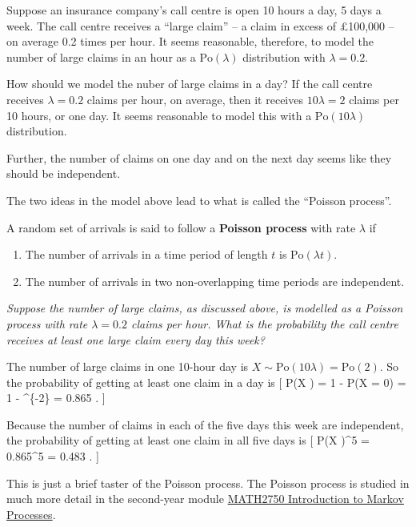 \documentclass[
  letterpaper,
]{report}
\providecommand{\tightlist}{%
  \setlength{\itemsep}{0pt}\setlength{\parskip}{0pt}}\usepackage{longtable,booktabs,array}
\theoremstyle{definition}
\theoremstyle{definition}
\theoremstyle{remark}
\begin{document}
Suppose an insurance company's call centre is open 10 hours a day, 5
days a week. The call centre receives a ``large claim'' -- a claim in
excess of £100,000 -- on average 0.2 times per hour. It seems
reasonable, therefore, to model the number of large claims in an hour as
a \(\mathrm{Po}(\lambda)\) distribution with \(\lambda = 0.2\).

How should we model the nuber of large claims in a day? If the call
centre receives \(\lambda = 0.2\) claims per hour, on average, then it
receives \(10\lambda = 2\) claims per 10 hours, or one day. It seems
reasonable to model this with a \(\mathrm{Po}(10\lambda)\) distribution.

Further, the number of claims on one day and on the next day seems like
they should be independent.

The two ideas in the model above lead to what is called the ``Poisson
process''.

A random set of arrivals is said to follow a \textbf{Poisson process}
with rate \(\lambda\) if

\begin{enumerate}
\def\labelenumi{\arabic{enumi}.}
\tightlist
\item
  The number of arrivals in a time period of length \(t\) is
  \(\mathrm{Po}(\lambda t)\).
\item
  The number of arrivals in two non-overlapping time periods are
  independent.
\end{enumerate}

\emph{Suppose the number of large claims, as discussed above, is
modelled as a Poisson process with rate \(\lambda = 0.2\) claims per
hour. What is the probability the call centre receives at least one
large claim every day this week?}

The number of large claims in one 10-hour day is
\(X \sim \mathrm{Po}(10\lambda) = \mathrm{Po}(2)\). So the probability
of getting at least one claim in a day is {[} \mathbb P(X ) = 1 -
\mathbb P(X = 0) = 1 - \^{}\{-2\} = 0.865 . {]}

Because the number of claims in each of the five days this week are
independent, the probability of getting at least one claim in all five
days is {[} \mathbb P(X )\^{}5 = 0.865\^{}5 = 0.483 . {]}

This is just a brief taster of the Poisson process. The Poisson process
is studied in much more detail in the second-year module
\href{https://mpaldridge.github.io/math2750/}{MATH2750 Introduction to
Markov Processes}.
\end{document}
